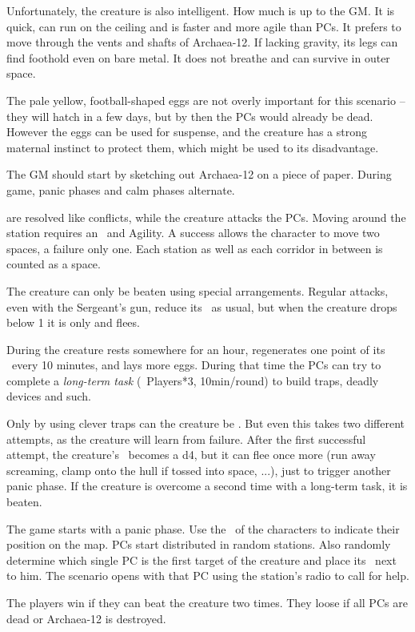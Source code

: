 {		Unfortunately, the creature is also intelligent. How much is up to the GM. It is quick, can run on the ceiling and is faster and more agile than PCs. It prefers to move through the vents and shafts of Archaea-12. If lacking gravity, its legs can find foothold even on bare metal. It does not breathe and can survive in outer space.

		The pale yellow, football-shaped eggs are not overly important for this scenario -- they will hatch in a few days, but by then the PCs would already be dead. However the eggs can be used for suspense, and the creature has a strong maternal instinct to protect them, which might be used to its disadvantage.


		\noindent
		The GM should start by sketching out Archaea-12 on a piece of paper. During game, panic phases and calm phases alternate.

		 are resolved like conflicts, while the creature attacks the PCs. Moving around the station requires an \AD~and Agility. A success allows the character to move two spaces, a failure only one. Each station as well as each corridor in between is counted as a space.

		The creature can only be beaten using special arrangements. Regular attacks, even with the Sergeant's gun, reduce its \HD\ as usual, but when the creature drops below 1 it is only  and flees.

		During  the creature rests somewhere for an hour, regenerates one point of its \HD\ every 10 minutes, and lays more eggs. During that time the PCs can try to complete a \emph{long-term task} (\TN~Players*3, 10min/round) to build traps, deadly devices and such.

		Only by using clever traps can the creature be . But even this takes two different attempts, as the creature will learn from failure. After the first successful attempt, the creature's \HD~becomes a d4, but it can flee once more (run away screaming, clamp onto the hull if tossed into space, ...), just to trigger another panic phase. If the creature is overcome a second time with a long-term task, it is beaten.

		The game starts with a panic phase. Use the \HD\ of the characters to indicate their position on the map. PCs start distributed in random stations. Also randomly determine which single PC is the first target of the creature and place its \HD\ next to him. The scenario opens with that PC using the station's radio to call for help.


		\noindent
		The players win if they can beat the creature two times. They loose if all PCs are dead or Archaea-12 is destroyed.

}
